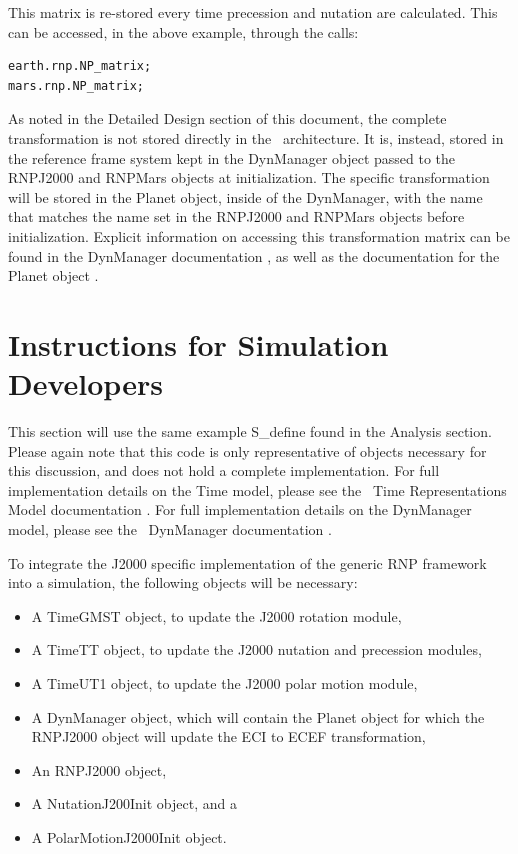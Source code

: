 This matrix is re-stored every time precession and nutation are calculated. This
can be accessed, in the above example, through the calls:

\begin{verbatim}
earth.rnp.NP_matrix;
mars.rnp.NP_matrix;
\end{verbatim}

As noted in the Detailed Design section of this document, the complete
transformation is not stored directly in the \ModelDesc\ architecture. It is,
instead, stored in the reference frame system kept in the DynManager object
passed to the RNPJ2000 and RNPMars objects at initialization. The specific
transformation will be stored in the Planet object, inside of the DynManager,
with the name that matches the name set in the RNPJ2000 and RNPMars objects
before initialization.
Explicit information on accessing this transformation matrix can be found
in the DynManager documentation \cite{dynenv:DYNMANAGER}, as well as the
documentation for the Planet object \cite{dynenv:PLANET}.


\section{Instructions for Simulation Developers}

This section will use the same example S\_define found in the Analysis section.
Please again note that this code is only representative of objects necessary
for this discussion, and does not hold a complete implementation.
For full implementation details on the Time model, please see
the \JEODid\ Time Representations Model documentation \cite{dynenv:TIME}.
For full implementation details on the DynManager model,
please see the \JEODid\ DynManager documentation
\cite{dynenv:DYNMANAGER}.

To integrate the J2000 specific implementation of the generic RNP framework
into a simulation, the following objects will be necessary:

\begin{itemize}
\item{A TimeGMST object}, to update the J2000 rotation module,
\item{A TimeTT object}, to update the J2000 nutation and precession modules,
\item{A TimeUT1 object}, to update the J2000 polar motion module,
\item{A DynManager object}, which will contain the Planet object for which the
RNPJ2000 object will update the ECI to ECEF transformation,
\item{An RNPJ2000 object},
\item{A NutationJ200Init object}, and a
\item{A PolarMotionJ2000Init object}.
\end{itemize}

